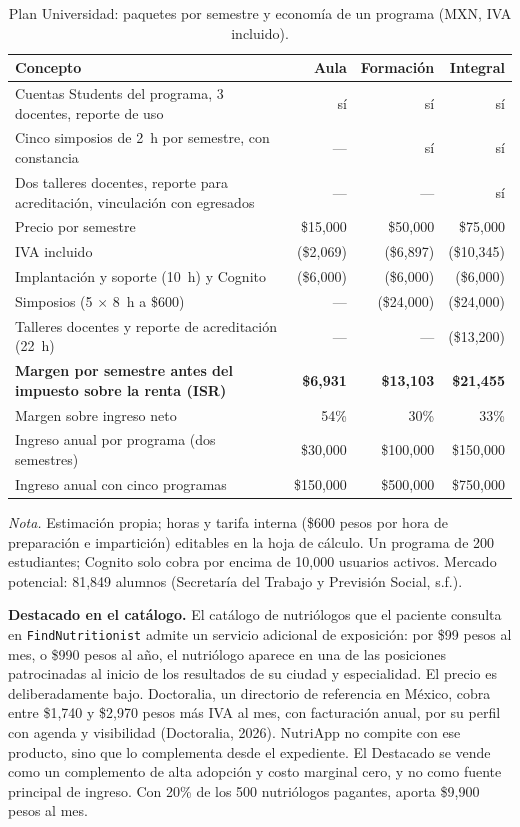 \documentclass[12pt, a4paper]{article}
\begin{document}
\begin{table}[!htbp]
  \centering
  \caption{Plan Universidad: paquetes por semestre y economía de un programa
  (MXN, IVA incluido).}
  \label{tab:universidad}
  \footnotesize
  \begin{tabularx}{\textwidth}{X r r r}
    \toprule
    \textbf{Concepto} & \textbf{Aula} & \textbf{Formación} & \textbf{Integral} \\
    \midrule
    Cuentas Students del programa, 3 docentes, reporte de uso & sí & sí & sí \\
    Cinco simposios de 2~h por semestre, con constancia & --- & sí & sí \\
    Dos talleres docentes, reporte para acreditación, vinculación con egresados & --- & --- & sí \\
    \midrule
    Precio por semestre & \$15,000 & \$50,000 & \$75,000 \\
    IVA incluido & (\$2,069) & (\$6,897) & (\$10,345) \\
    Implantación y soporte (10~h) y Cognito & (\$6,000) & (\$6,000) & (\$6,000) \\
    Simposios (5 $\times$ 8~h a \$600) & --- & (\$24,000) & (\$24,000) \\
    Talleres docentes y reporte de acreditación (22~h) & --- & --- & (\$13,200) \\
    \textbf{Margen por semestre antes del impuesto sobre la renta (ISR)} & \textbf{\$6,931} & \textbf{\$13,103} & \textbf{\$21,455} \\
    Margen sobre ingreso neto & 54\% & 30\% & 33\% \\
    \midrule
    Ingreso anual por programa (dos semestres) & \$30,000 & \$100,000 & \$150,000 \\
    Ingreso anual con cinco programas & \$150,000 & \$500,000 & \$750,000 \\
    \bottomrule
  \end{tabularx}
  \begin{flushleft}
    \small\textit{Nota.} Estimación propia; horas y tarifa interna
    (\$600 pesos por hora de preparación e impartición) editables en la hoja
    de cálculo. Un programa de 200 estudiantes; Cognito solo cobra por
    encima de 10,000 usuarios activos. Mercado potencial: 81,849 alumnos
    (Secretaría del Trabajo y Previsión Social, s.f.).
  \end{flushleft}
\end{table}

\textbf{Destacado en el catálogo.} El catálogo de nutriólogos que el
paciente consulta en \texttt{FindNutritionist} admite un servicio
adicional de exposición: por \$99 pesos al mes, o \$990 pesos al año, el
nutriólogo aparece en una de las posiciones patrocinadas al inicio de
los resultados de su ciudad y especialidad. El precio es deliberadamente
bajo. Doctoralia, un directorio de referencia en México, cobra entre
\$1,740 y \$2,970 pesos más IVA al mes, con facturación anual, por su
perfil con agenda y visibilidad (Doctoralia, 2026). NutriApp no compite
con ese producto, sino que lo complementa desde el expediente. El
Destacado se vende como un complemento de alta adopción y costo marginal
cero, y no como fuente principal de ingreso. Con 20\% de los 500
nutriólogos pagantes, aporta \$9,900 pesos al mes.
\end{document}
